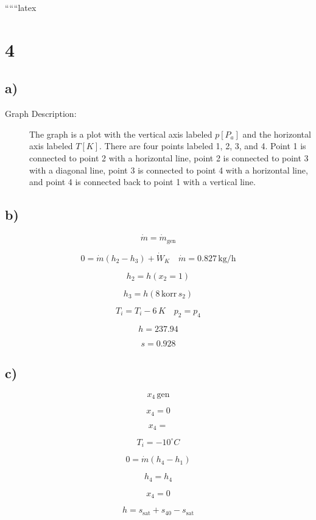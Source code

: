 
``````latex


\section*{4}

\subsection*{a)}

\begin{description}
    \item[Graph Description:] The graph is a plot with the vertical axis labeled \( p [P_a] \) and the horizontal axis labeled \( T [K] \). There are four points labeled 1, 2, 3, and 4. Point 1 is connected to point 2 with a horizontal line, point 2 is connected to point 3 with a diagonal line, point 3 is connected to point 4 with a horizontal line, and point 4 is connected back to point 1 with a vertical line.
\end{description}

\subsection*{b)}

\[
\dot{m} = \dot{m}_{\text{gen}}
\]

\[
0 = \dot{m} (h_2 - h_3) + \dot{W}_K \quad \dot{m} = 0.827 \, \text{kg/h}
\]

\[
h_2 = h \left( x_2 = 1 \right)
\]

\[
h_3 = h \left( 8 \, \text{korr} \, s_2 \right)
\]

\[
T_i = T_i - 6 \, K \quad p_2 = p_4
\]

\[
h = 237.94
\]

\[
s = 0.928
\]

\subsection*{c)}

\[
x_4 \, \text{gen}
\]

\[
x_4 = 0
\]

\[
x_4 =
\]

\[
T_i = -10^\circ C
\]

\[
0 = \dot{m} (h_4 - h_1)
\]

\[
h_4 = h_4
\]

\[
x_4 = 0
\]

\[
h = s_{\text{sat}} + s_{40} - s_{\text{sat}}
\]

